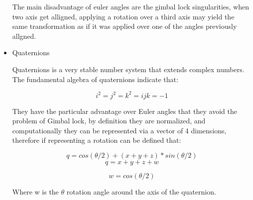 \begin{itemize}
	The main disadvantage of euler angles are the gimbal lock singularities, when two axis get alligned, applying a rotation over a third axis may yield the same transformation as if it was applied over one of the angles previously allgned.
	
	\item  Quaternions
	

	Quaternions is a very stable number system that extends complex numbers.
	The fundamental algebra of quaternions indicate that:
	
	\begin{equation}\label{equ:enc}
	i^{2} = j^{2} = k^{2} = ijk = -1
	\end{equation}
	
	They have the particular advantage over Euler angles that they avoid the problem of Gimbal lock, by definition they are normalized, and computationally they can be represented via a vector of 4 dimensions, therefore if representing a rotation can be defined that:	
	
	\begin{equation}\label{equ:enc}
	q = cos({\theta} /2) + (x + y + z)*sin({\theta} /2)
	\end{equation}
	\begin{equation}\label{equ:enc}	
	q = x + y + z + w
	\end{equation}
	
	
	\begin{equation}\label{equ:enc}
	w = cos({\theta} /2)
	\end{equation}
	
	
	Where w is the {$\theta$} rotation angle around the axis of the quaternion.
	
	
	
	
\end{itemize}
